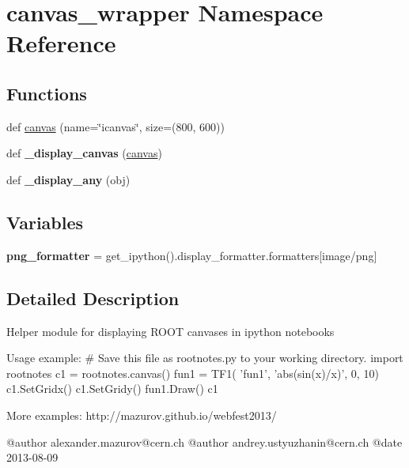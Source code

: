 \hypertarget{namespacecanvas__wrapper}{}\section{canvas\+\_\+wrapper Namespace Reference}
\label{namespacecanvas__wrapper}
\subsection*{Functions}
\begin{DoxyCompactItemize}
\item 
def \hyperlink{namespacecanvas__wrapper_aeba5fd94e005cd99245deb78314af8d1}{canvas} (name=\char`\"{}icanvas\char`\"{}, size=(800, 600))
\item 
\hypertarget{namespacecanvas__wrapper_a599964c201b5325978c188bf42a5a6e2}{}\label{namespacecanvas__wrapper_a599964c201b5325978c188bf42a5a6e2} 
def {\bfseries \+\_\+display\+\_\+canvas} (\hyperlink{namespacecanvas__wrapper_aeba5fd94e005cd99245deb78314af8d1}{canvas})
\item 
\hypertarget{namespacecanvas__wrapper_aeb14ff6dc58ee428879948f1e4cb3093}{}\label{namespacecanvas__wrapper_aeb14ff6dc58ee428879948f1e4cb3093} 
def {\bfseries \+\_\+display\+\_\+any} (obj)
\end{DoxyCompactItemize}
\subsection*{Variables}
\begin{DoxyCompactItemize}
\item 
\hypertarget{namespacecanvas__wrapper_a67ab2edb7712a9e37cc45faad997f916}{}\label{namespacecanvas__wrapper_a67ab2edb7712a9e37cc45faad997f916} 
{\bfseries png\+\_\+formatter} = get\+\_\+ipython().display\+\_\+formatter.\+formatters\mbox{[}\textquotesingle{}image/png\textquotesingle{}\mbox{]}
\end{DoxyCompactItemize}


\subsection{Detailed Description}
\begin{DoxyVerb}Helper module for displaying ROOT canvases in ipython notebooks

Usage example:
# Save this file as rootnotes.py to your working directory.
import rootnotes
c1 = rootnotes.canvas()
fun1 = TF1( 'fun1', 'abs(sin(x)/x)', 0, 10)
c1.SetGridx()
c1.SetGridy()
fun1.Draw()
c1

More examples: http://mazurov.github.io/webfest2013/

@author alexander.mazurov@cern.ch
@author andrey.ustyuzhanin@cern.ch
@date 2013-08-09
\end{DoxyVerb}
 

